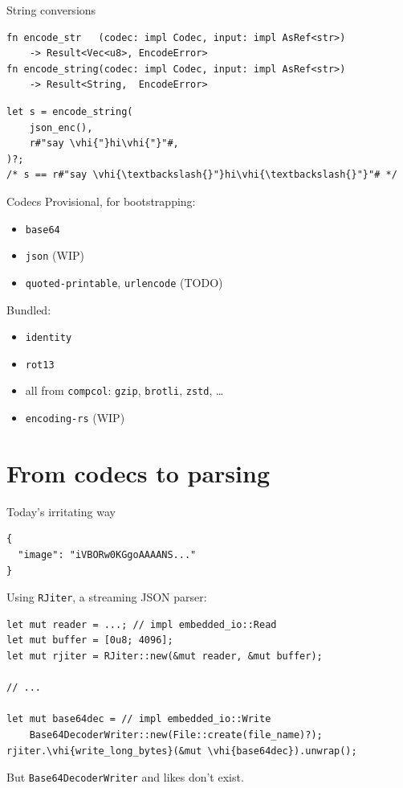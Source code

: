 \documentclass[aspectratio=169,11pt]{beamer}
\newcommand{\vhi}[1]{\mbox{\colorbox{yellow}{#1}}}
\begin{document}
\begin{frame}[fragile]{String conversions}
\begin{Verbatim}[fontsize=\small,frame=single]
fn encode_str   (codec: impl Codec, input: impl AsRef<str>)
    -> Result<Vec<u8>, EncodeError>
fn encode_string(codec: impl Codec, input: impl AsRef<str>)
    -> Result<String,  EncodeError>
\end{Verbatim}

\medskip
\begin{Verbatim}[fontsize=\large,frame=single,commandchars=\\\{\}]
let s = encode_string(
    json_enc(),
    r#"say \vhi{"}hi\vhi{"}"#,
)?;
/* s == r#"say \vhi{\textbackslash{}"}hi\vhi{\textbackslash{}"}"# */
\end{Verbatim}
\end{frame}

\begin{frame}{Codecs}
Provisional, for bootstrapping:
\begin{itemize}
\item \texttt{base64}
\item \texttt{json} (WIP)
\item \texttt{quoted-printable}, \texttt{urlencode} (TODO)
\end{itemize}

\medskip
Bundled:
\begin{itemize}
\item \texttt{identity}
\item \texttt{rot13}
\item all from \texttt{compcol}: \texttt{gzip}, \texttt{brotli}, \texttt{zstd}, \dots
\item \texttt{encoding-rs} (WIP)
\end{itemize}
\end{frame}

\section{From codecs to parsing}
\frame{\sectionpage}

\begin{frame}[fragile]{Today's irritating way}
\begin{Verbatim}[fontsize=\small,frame=single]
{
  "image": "iVBORw0KGgoAAAANS..."
}
\end{Verbatim}

Using \texttt{RJiter}, a streaming JSON parser:
\begin{Verbatim}[fontsize=\small,frame=single,commandchars=\\\{\}]
let mut reader = ...; // impl embedded_io::Read
let mut buffer = [0u8; 4096];
let mut rjiter = RJiter::new(&mut reader, &mut buffer);

// ...

let mut base64dec = // impl embedded_io::Write
    Base64DecoderWriter::new(File::create(file_name)?);
rjiter.\vhi{write_long_bytes}(&mut \vhi{base64dec}).unwrap();
\end{Verbatim}

But \texttt{Base64DecoderWriter} and likes don't exist.
\end{frame}
\end{document}
